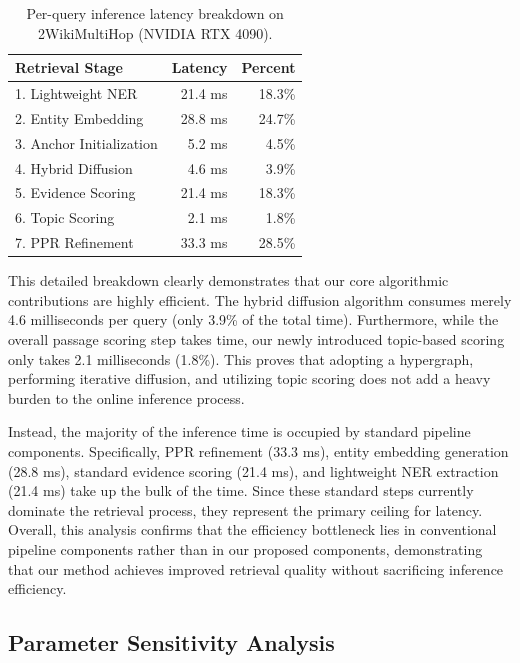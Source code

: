 \begin{table}[h]
    \centering
    \begin{tabular}{lrr}
        \toprule
        \textbf{Retrieval Stage} & \textbf{Latency} & \textbf{Percent} \\
        \midrule
        1. Lightweight NER          & 21.4 ms & 18.3\% \\
        2. Entity Embedding         & 28.8 ms & 24.7\% \\
        3. Anchor Initialization    & 5.2 ms  & 4.5\%  \\
        4. Hybrid Diffusion         & 4.6 ms  & 3.9\%  \\
        5. Evidence Scoring & 21.4 ms & 18.3\% \\
        6. Topic Scoring  & 2.1 ms  & 1.8\%  \\
        7. PPR Refinement           & 33.3 ms & 28.5\% \\
        \bottomrule
    \end{tabular}
    \caption{Per-query inference latency breakdown on 2WikiMultiHop (NVIDIA RTX 4090).}
    \label{tab:latency_breakdown}
\end{table}

This detailed breakdown clearly demonstrates that our core algorithmic contributions are highly efficient. The hybrid diffusion algorithm consumes merely 4.6 milliseconds per query (only 3.9\% of the total time). Furthermore, while the overall passage scoring step takes time, our newly introduced topic-based scoring only takes 2.1 milliseconds (1.8\%). This proves that adopting a hypergraph, performing iterative diffusion, and utilizing topic scoring does not add a heavy burden to the online inference process.

Instead, the majority of the inference time is occupied by standard pipeline components. Specifically, PPR refinement (33.3 ms), entity embedding generation (28.8 ms), standard evidence scoring (21.4 ms), and lightweight NER extraction (21.4 ms) take up the bulk of the time. Since these standard steps currently dominate the retrieval process, they represent the primary ceiling for latency. Overall, this analysis confirms that the efficiency bottleneck lies in conventional pipeline components rather than in our proposed components, demonstrating that our method achieves improved retrieval quality without sacrificing inference efficiency.

\subsection{Parameter Sensitivity Analysis}
\label{sec:param_sensitivity}

